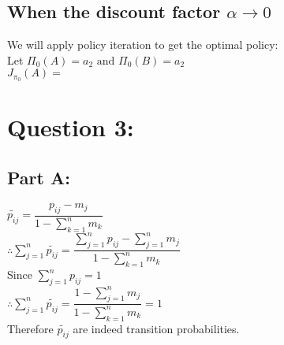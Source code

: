 \documentclass{article}
\begin{document}
\subsection{When the discount factor  ${\alpha \to 0}$}
We will apply policy iteration to get the optimal policy:\\
Let $\Pi_0(A)=a_2 \textrm{ and } \Pi_0(B)=a_2$\\
$J_{\pi_0}(A)=$



\section{Question 3:}

\subsection{Part A:}
$\tilde{p_{ij}}=\dfrac{p_{ij}-m_j}{1-\sum_{k=1}^{n}m_k}$\\
$\therefore \sum_{j=1}^{n}\tilde{p_{ij}}=\dfrac{\sum_{j=1}^{n}p_{ij}-\sum_{j=1}^{n}m_j}{1-\sum_{k=1}^{n}m_k}$\\
Since $\displaystyle \sum_{j=1}^{n}p_{ij}=1$\\
$\therefore \sum_{j=1}^{n}\tilde{p_{ij}}=\dfrac{1-\sum_{j=1}^{n}m_j}{1-\sum_{k=1}^{n}m_k}=1$\\

Therefore $\tilde{p_{ij}}$ are indeed transition probabilities.
\end{document}
